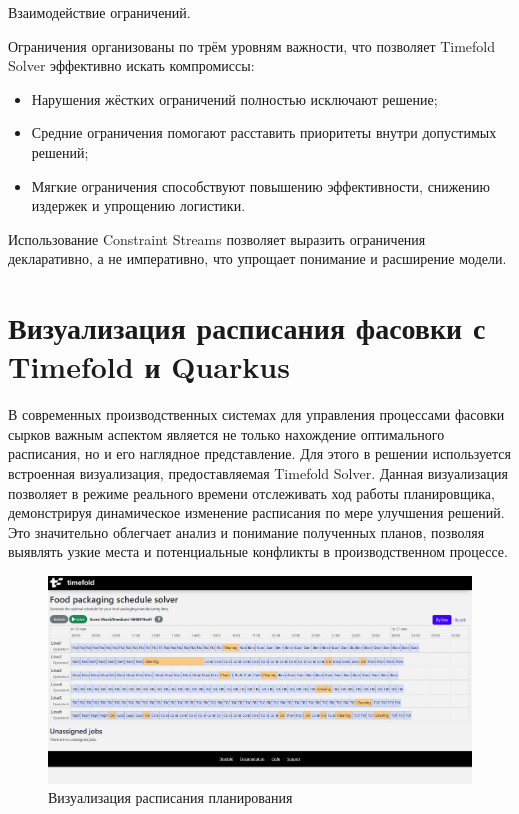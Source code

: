  Взаимодействие ограничений.

Ограничения организованы по трём уровням важности, что позволяет Timefold Solver эффективно искать компромиссы:

\begin{itemize}
    \item Нарушения жёстких ограничений полностью исключают решение;
    \item Средние ограничения помогают расставить приоритеты внутри допустимых решений;
    \item Мягкие ограничения способствуют повышению эффективности, снижению издержек и упрощению логистики.
\end{itemize}

Использование Constraint Streams позволяет выразить ограничения декларативно, а не императивно, что упрощает понимание и расширение модели.

\section{Визуализация расписания фасовки с Timefold и Quarkus}

В современных производственных системах для управления процессами фасовки сырков важным аспектом является не только нахождение оптимального расписания, но и его наглядное представление. Для этого в решении используется встроенная визуализация, предоставляемая Timefold Solver. Данная визуализация позволяет в режиме реального времени отслеживать ход работы планировщика, демонстрируя динамическое изменение расписания по мере улучшения решений. Это значительно облегчает анализ и понимание полученных планов, позволяя выявлять узкие места и потенциальные конфликты в производственном процессе.

 \begin{figure}[ht]
 \centering
		\includegraphics[height = 8 cm, keepaspectratio]{../assets/images/3_1_1Quarkus.png}
		\caption{Визуализация расписания планирования}
		\label{fig:quarkus_3_1}
\end{figure}

